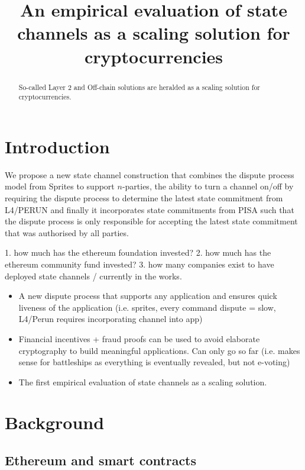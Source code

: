\documentclass{llncs}
\begin{document}
	\title{An empirical evaluation of state channels as a scaling solution for cryptocurrencies}
	\maketitle
	\begin{abstract}
		So-called Layer 2 and Off-chain solutions are heralded as a scaling solution for cryptocurrencies. 
	\end{abstract} 

\section{Introduction}

We propose a new state channel construction that combines the dispute process model from Sprites to support $n$-parties, the ability to turn a channel on/off by requiring the dispute process to determine the latest state commitment from L4/PERUN and finally it incorporates state commitments from PISA such that the dispute process is only responsible for accepting the latest state commitment that was authorised by all parties. 


1. how much has the ethereum foundation invested?
2. how much has the ethereum community fund invested?
3. how many companies exist to have deployed state channels / currently in the works. 



\begin{itemize}
\item A new dispute process that supports any application and ensures quick liveness of the application (i.e. sprites, every command dispute = slow, L4/Perun requires incorporating channel into app)
\item Financial incentives + fraud proofs can be used to avoid elaborate cryptography to build meaningful applications. Can only go so far (i.e. makes sense for battleships as everything is eventually revealed, but not e-voting) 
\item The first empirical evaluation of state channels as a scaling solution. 

\end{itemize}
\section{Background}

\subsection{Ethereum and smart contracts}
\end{document}
